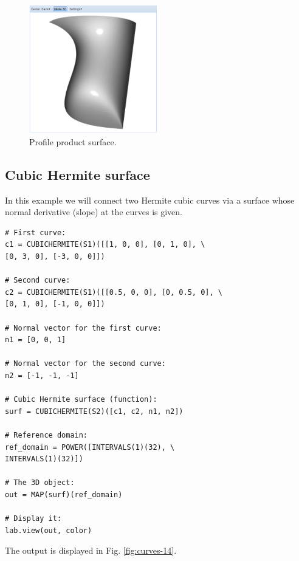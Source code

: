 \documentclass[article,A4,12pt]{llncs}
\begin{document}
\begin{figure}[!ht]
\begin{center}
\includegraphics[width=0.5\textwidth]{img/curves-13.png}
\end{center}
\vspace{-2mm}
\caption{Profile product surface.}
\label{fig:curves-13}
\end{figure}

\subsection{Cubic Hermite surface}

In this example we will connect two Hermite cubic curves
via a surface whose normal derivative (slope) at the curves
is given. 

\begin{verbatim}
# First curve:
c1 = CUBICHERMITE(S1)([[1, 0, 0], [0, 1, 0], \
[0, 3, 0], [-3, 0, 0]])

# Second curve:
c2 = CUBICHERMITE(S1)([[0.5, 0, 0], [0, 0.5, 0], \
[0, 1, 0], [-1, 0, 0]])

# Normal vector for the first curve:
n1 = [0, 0, 1]

# Normal vector for the second curve:
n2 = [-1, -1, -1]

# Cubic Hermite surface (function):
surf = CUBICHERMITE(S2)([c1, c2, n1, n2])

# Reference domain:
ref_domain = POWER([INTERVALS(1)(32), \
INTERVALS(1)(32)])

# The 3D object:
out = MAP(surf)(ref_domain)

# Display it:
lab.view(out, color)
\end{verbatim}
The output is displayed in Fig. \ref{fig:curves-14}.

\newpage
\end{document}
